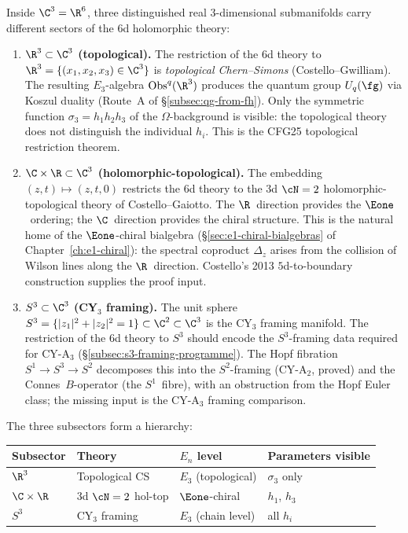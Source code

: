 Inside $\C^3 = \R^6$, three distinguished real $3$-dimensional submanifolds carry different sectors of the $6$d holomorphic theory:

\begin{enumerate}[label=\textup{(\arabic*)}]
 \item \textbf{$\R^3 \subset \C^3$ (topological).} The restriction of the $6$d theory to $\R^3 = \{(x_1, x_2, x_3) \in \C^3\}$ is \emph{topological Chern--Simons} (Costello--Gwilliam). The resulting $E_3$-algebra $\mathrm{Obs}^q(\R^3)$ produces the quantum group $U_q(\fg)$ via Koszul duality (Route~A of \S\ref{subsec:qg-from-fh}). Only the symmetric function $\sigma_3 = h_1 h_2 h_3$ of the $\Omega$-background is visible: the topological theory does not distinguish the individual $h_i$. This is the CFG25 topological restriction theorem.

 \item \textbf{$\C \times \R \subset \C^3$ (holomorphic-topological).} The embedding $(z, t) \mapsto (z, t, 0)$ restricts the $6$d theory to the $3$d $\cN = 2$ holomorphic-topological theory of Costello--Gaiotto. The $\R$~direction provides the $\Eone$~ordering; the $\C$~direction provides the chiral structure. This is the natural home of the $\Eone$-chiral bialgebra (\S\ref{sec:e1-chiral-bialgebras} of Chapter~\ref{ch:e1-chiral}): the spectral coproduct $\Delta_z$ arises from the collision of Wilson lines along the $\R$~direction. Costello's 2013 $5$d-to-boundary construction supplies the proof input.

 \item \textbf{$S^3 \subset \C^3$ (CY$_3$ framing).} The unit sphere $S^3 = \{|z_1|^2 + |z_2|^2 = 1\} \subset \C^2 \subset \C^3$ is the CY$_3$ framing manifold. The restriction of the $6$d theory to $S^3$ should encode the $S^3$-framing data required for CY-A$_3$ (\S\ref{subsec:s3-framing-programme}). The Hopf fibration $S^1 \to S^3 \to S^2$ decomposes this into the $S^2$-framing (CY-A$_2$, proved) and the Connes~$B$-operator (the $S^1$~fibre), with an obstruction from the Hopf Euler class; the missing input is the CY-A$_3$ framing comparison.
\end{enumerate}

\noindent The three subsectors form a hierarchy:
\begin{center}
\small
\begin{tabular}{llll}
 \toprule
 \textbf{Subsector} & \textbf{Theory} & \textbf{$E_n$ level} & \textbf{Parameters visible} \\
 \midrule
 $\R^3$ & Topological CS & $E_3$ (topological) & $\sigma_3$ only \\
 $\C \times \R$ & 3d $\cN=2$ hol-top & $\Eone$-chiral & $h_1$, $h_3$ \\
 $S^3$ & CY$_3$ framing & $E_3$ (chain level) & all $h_i$ \\
 \bottomrule
\end{tabular}
\end{center}

